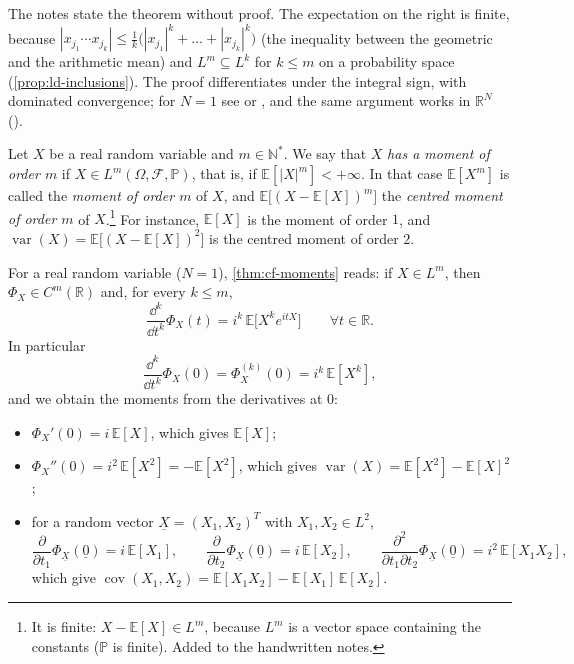 The notes state the theorem without proof. The expectation on the right is finite, because
$|x_{j_1}\cdots x_{j_k}|\le\frac1k\big(|x_{j_1}|^k+\dots+|x_{j_k}|^k\big)$ (the inequality
between the geometric and the arithmetic mean) and $L^m\subseteq L^k$ for $k\le m$ on a
probability space (\cref{prop:ld-inclusions}). The proof differentiates under the integral sign,
with dominated convergence; for $N=1$ see \citet[Section~26, ``Moments and
Derivatives'']{billingsley} or \citet[Section~3.3.3]{durrett}, and the same argument works in
$\mathbb R^N$ ().

\begin{remark}[Moments]\label{rem:cf-moments}
Let $X$ be a real random variable and $m\in\mathbb N^*$. We say that $X$ \emph{has a moment of
order $m$} if $X\in L^m(\Omega,\mathcal F,\mathbb P)$, that is, if $\mathbb E[|X|^m]<+\infty$. In
that case $\mathbb E[X^m]$ is called the \emph{moment of order $m$} of $X$, and
$\mathbb E\big[(X-\mathbb E[X])^m\big]$ the \emph{centred moment of order $m$} of
$X$.\footnote{It is finite: $X-\mathbb E[X]\in L^m$, because $L^m$ is a vector space containing
the constants ($\mathbb P$ is finite). Added to the handwritten notes.} For instance,
$\mathbb E[X]$ is the moment of order $1$, and
$\operatorname{var}(X)=\mathbb E\big[(X-\mathbb E[X])^2\big]$ is the centred moment of order $2$.
\end{remark}

For a real random variable ($N=1$), \cref{thm:cf-moments} reads: if $X\in L^m$, then
$\Phi_X\in C^m(\mathbb R)$ and, for every $k\le m$,
\[
  \frac{\dd^k}{\dd t^k}\Phi_X(t)=i^k\,\mathbb E\big[X^ke^{itX}\big]\qquad\forall t\in\mathbb R .
\]
In particular
\begin{equation}\label{eq:cf-moments}
  \frac{\dd^k}{\dd t^k}\Phi_X(0)=\Phi_X^{(k)}(0)=i^k\,\mathbb E[X^k],
\end{equation}
and we obtain the moments from the derivatives at $0$:
\begin{itemize}
  \item $\Phi_X'(0)=i\,\mathbb E[X]$, which gives $\mathbb E[X]$;
  \item $\Phi_X''(0)=i^2\,\mathbb E[X^2]=-\mathbb E[X^2]$, which gives
    $\operatorname{var}(X)=\mathbb E[X^2]-\mathbb E[X]^2$;
  \item for a random vector $\underline X=(X_1,X_2)^T$ with $X_1,X_2\in L^2$,
    \[
      \frac{\partial}{\partial t_1}\Phi_{\underline X}(\underline 0)=i\,\mathbb E[X_1],\qquad
      \frac{\partial}{\partial t_2}\Phi_{\underline X}(\underline 0)=i\,\mathbb E[X_2],\qquad
      \frac{\partial^2}{\partial t_1\partial t_2}\Phi_{\underline X}(\underline 0)=i^2\,\mathbb E[X_1X_2],
    \]
    which give $\operatorname{cov}(X_1,X_2)=\mathbb E[X_1X_2]-\mathbb E[X_1]\,\mathbb E[X_2]$.
\end{itemize}


